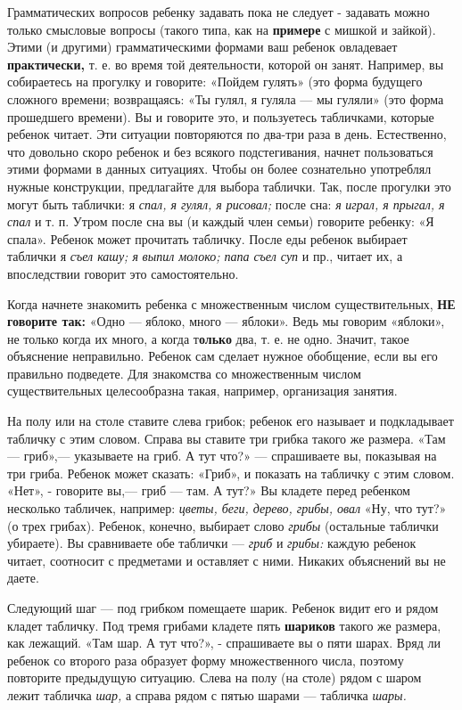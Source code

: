 \documentclass{book}
\renewcommand{\emph}[1]{\textit{#1}}
\begin{document}
Грамматических вопросов ребенку задавать пока не следует - задавать
можно только смысловые вопросы (такого типа, как на \textbf{примере} с
мишкой и зайкой). Этими (и другими) грамматическими формами ваш ребенок
овладевает \textbf{практически,} т. е. во время той деятельности,
которой он занят. Например, вы собираетесь на прогулку и говорите:
«Пойдем гулять» (это форма будущего сложного времени; возвращаясь: «Ты
гулял, я гуляла --- мы гуляли» (это форма прошедшего времени). Вы и
говорите это, и пользуетесь табличками, которые ребенок читает. Эти
ситуации повторяются по два-три раза в день. Естественно, что довольно
скоро ребенок и без всякого подстегивания, начнет пользоваться этими
формами в данных ситуациях. Чтобы он более сознательно употреблял нужные
конструкции, предлагайте для выбора таблички. Так, после прогулки это
могут быть таблички: я \emph{спал, я гулял, я рисовал;} после сна:
\emph{я} \emph{играл, я прыгал, я спал} и т. п. Утром после сна вы (и
каждый член семьи) говорите ребенку: «Я спала». Ребенок может прочитать
табличку. После еды ребенок выбирает таблички я \emph{съел кашу; я}
\emph{выпил молоко; папа съел суп} и пр., читает их, а впоследствии
говорит это самостоятельно.

Когда начнете знакомить ребенка с множественным числом существительных,
\textbf{НЕ говорите так:} «Одно --- яблоко, много --- яблоки». Ведь мы
говорим «яблоки», не только когда их много, а когда т\textbf{олько} два,
т. е. не одно. Значит, такое объяснение неправильно. Ребенок сам сделает
нужное обобщение, если вы его правильно подведете. Для знакомства со
множественным числом существительных целесообразна такая, например,
организация занятия.

На полу или на столе ставите слева грибок; ребенок его называет и
подкладывает табличку с этим словом. Справа вы ставите три грибка такого
же размера. «Там --- гриб»,--- указываете на гриб. А тут что?» ---
спрашиваете вы, показывая на три гриба. Ребенок может сказать: «Гриб», и
показать на табличку с этим словом. «Нет», - говорите вы,--- гриб ---
там. А тут?» Вы кладете перед ребенком несколько табличек, например:
\emph{цветы, беги, дерево, грибы, овал} «Ну, что тут?» (о трех грибах).
Ребенок, конечно, выбирает слово \emph{грибы} (остальные таблички
убираете). Вы сравниваете обе таблички --- \emph{гриб} и \emph{грибы:}
каждую ребенок читает, соотносит с предметами и оставляет с ними.
Никаких объяснений вы не даете.

Следующий шаг --- под грибком помещаете шарик. Ребенок видит его и рядом
кладет табличку. Под тремя грибами кладете пять \textbf{шариков} такого
же размера, как лежащий. «Там шар. А тут что?», - спрашиваете вы о пяти
шарах. Вряд ли ребенок со второго раза образует форму множественного
числа, поэтому повторите предыдущую ситуацию. Слева на полу (на столе)
рядом с шаром лежит табличка \emph{шар,} а справа рядом с пятью шарами
--- табличка \emph{шары.}
\end{document}
